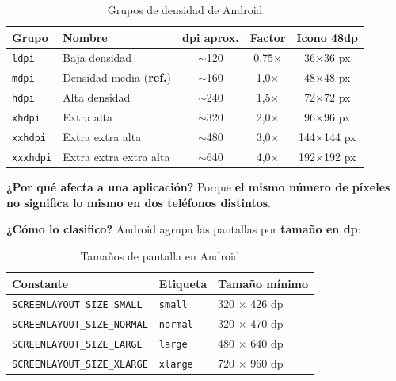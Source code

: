 \documentclass[11pt,a4paper]{article}
\newcommand{\code}[1]{\texttt{\color{navylight}#1}}
\newcommand{\campo}[1]{\textbf{\color{navy}#1}}
\begin{document}
	\begin{table}[htbp]
		\centering
		\small
		\begin{tabular}{@{}l l c c c@{}}
			\toprule
			\rowcolor{primary}
			\textcolor{paper}{\sffamily\bfseries Grupo} & \textcolor{paper}{\sffamily\bfseries Nombre} & \textcolor{paper}{\sffamily\bfseries dpi aprox.} & \textcolor{paper}{\sffamily\bfseries Factor} & \textcolor{paper}{\sffamily\bfseries Icono 48dp} \\
			\midrule
			\code{ldpi} & Baja densidad & $\sim$120 & 0,75$\times$ & 36$\times$36 px \\
			\rowcolor{soft}
			\code{mdpi} & Densidad media (\textbf{ref.}) & $\sim$160 & 1,0$\times$ & 48$\times$48 px \\
			\code{hdpi} & Alta densidad & $\sim$240 & 1,5$\times$ & 72$\times$72 px \\
			\rowcolor{soft}
			\code{xhdpi} & Extra alta & $\sim$320 & 2,0$\times$ & 96$\times$96 px \\
			\code{xxhdpi} & Extra extra alta & $\sim$480 & 3,0$\times$ & 144$\times$144 px \\
			\rowcolor{soft}
			\code{xxxhdpi} & Extra extra extra alta & $\sim$640 & 4,0$\times$ & 192$\times$192 px \\
			\bottomrule
		\end{tabular}
		\caption{Grupos de densidad de Android}
	\end{table}
	
	\campo{¿Por qué afecta a una aplicación?}
	Porque \textbf{el mismo número de píxeles no significa lo mismo en dos teléfonos distintos}.
	
	\textbf{\color{primary}¿Cómo lo clasifico?}
	Android agrupa las pantallas por \textbf{tamaño en dp}:
	
	\begin{table}[htbp]
		\centering
		\small
		\begin{tabular}{@{}l l l@{}}
			\toprule
			\rowcolor{primary}
			\textcolor{paper}{\sffamily\bfseries Constante} & \textcolor{paper}{\sffamily\bfseries Etiqueta} & \textcolor{paper}{\sffamily\bfseries Tamaño mínimo} \\
			\midrule
			\code{SCREENLAYOUT\_SIZE\_SMALL} & \code{small} & 320 $\times$ 426 dp \\
			\rowcolor{soft}
			\code{SCREENLAYOUT\_SIZE\_NORMAL} & \code{normal} & 320 $\times$ 470 dp \\
			\code{SCREENLAYOUT\_SIZE\_LARGE} & \code{large} & 480 $\times$ 640 dp \\
			\rowcolor{soft}
			\code{SCREENLAYOUT\_SIZE\_XLARGE} & \code{xlarge} & 720 $\times$ 960 dp \\
			\bottomrule
		\end{tabular}
		\caption{Tamaños de pantalla en Android}
	\end{table}
	
\end{document}
